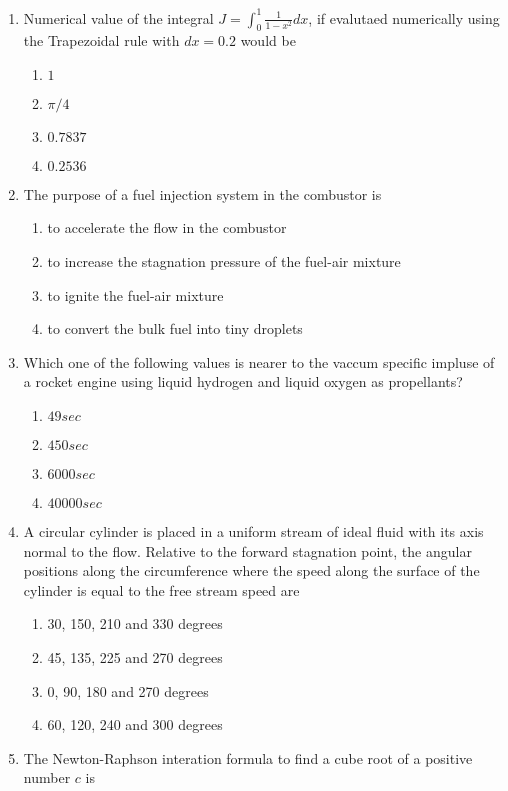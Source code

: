 \documentclass[journal]{IEEEtran}
\begin{document}
\begin{enumerate}
	\item Numerical value of the integral
		$J=\int_0^1\frac{1}{1-x^2}dx$, if evalutaed numerically using the Trapezoidal rule with $dx = 0.2$ would be
		\begin{enumerate}
			\item $1$
			\item $\pi/4$
			\item $0.7837$
			\item $0.2536$
		\end{enumerate}
	\item The purpose of a fuel injection system in the combustor is
		\begin{enumerate}
			\item to accelerate the flow in the combustor
			\item to increase the stagnation pressure of the fuel-air mixture
			\item to ignite the fuel-air mixture
			\item to convert the bulk fuel into tiny droplets
		\end{enumerate}
	\item Which one of the following values is nearer to the vaccum specific impluse of a rocket engine using liquid hydrogen and liquid oxygen as propellants?
		\begin{enumerate}
			\item $49 sec$
			\item $450 sec$
			\item $6000 sec$
			\item $40000 sec$
		\end{enumerate}
	\item A circular cylinder is placed in a uniform stream of ideal fluid with its axis normal to the flow. Relative to the forward stagnation point, the angular positions along the circumference where the speed along the surface of the cylinder is equal to the free stream speed are
		\begin{enumerate}
			\item 30, 150, 210 and 330 degrees
			\item 45, 135, 225 and 270 degrees
			\item 0, 90, 180 and 270 degrees
			\item 60, 120, 240 and 300 degrees
		\end{enumerate}
	\item The Newton-Raphson interation formula to find a cube root of a positive number $c$ is
		\begin{enumerate}

\end{enumerate}
\end{enumerate}
\end{document}
